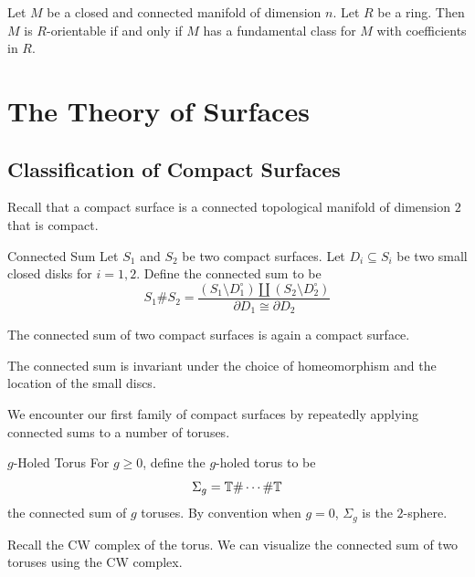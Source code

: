 \documentclass[a4paper]{article}
\begin{document}
\begin{lmm}{}{} Let $M$ be a closed and connected manifold of dimension $n$. Let $R$ be a ring. Then $M$ is $R$-orientable if and only if $M$ has a fundamental class for $M$ with coefficients in $R$. 
\end{lmm}

\pagebreak
\section{The Theory of Surfaces}
\subsection{Classification of Compact Surfaces}
Recall that a compact surface is a connected topological manifold of dimension $2$ that is compact. 

\begin{defn}{Connected Sum}{} Let $S_1$ and $S_2$ be two compact surfaces. Let $D_i\subseteq S_i$ be two small closed disks for $i=1,2$. Define the connected sum to be $$S_1\# S_2=\frac{(S_1\setminus D_1^\circ)\amalg(S_2\setminus D_2^\circ)}{\partial D_1\cong\partial D_2}$$
\end{defn}

\begin{lmm}{}{} The connected sum of two compact surfaces is again a compact surface. 
\end{lmm}

\begin{prp}{}{} The connected sum is invariant under the choice of homeomorphism and the location of the small discs. 
\end{prp}

We encounter our first family of compact surfaces by repeatedly applying connected sums to a number of toruses. 

\begin{defn}{$g$-Holed Torus}{} For $g\geq 0$, define the $g$-holed torus to be $$\Sigma_g=\mathbb{T}\#\cdots\#\mathbb{T}$$ the connected sum of $g$ toruses. By convention when $g=0$, $\Sigma_g$ is the $2$-sphere. 
\end{defn}

Recall the CW complex of the torus. We can visualize the connected sum of two toruses using the CW complex. 
\end{document}
